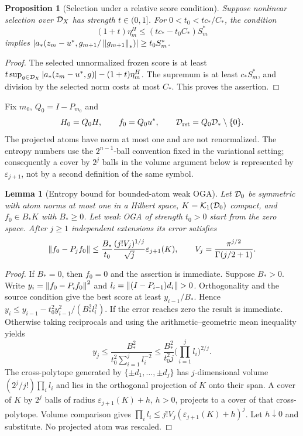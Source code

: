 \documentclass[11pt]{article}
\newtheorem{lemma}[theorem]{Lemma}
\newtheorem{proposition}[theorem]{Proposition}
\theoremstyle{remark}
\begin{document}
\begin{proposition}[Selection under a relative score condition]
\label{prop:c5-transfer}
Suppose nonlinear selection over $\mathcal D_X$ has strength $t\in(0,1]$.
For $0<t_0<tc_*/C_*$, the condition
\begin{equation}
 (1+t)\eta_m^H\leq(tc_*-t_0C_*)S_m^*
 \label{eq:c5-relative}
\end{equation}
implies
$|a_*(z_m-u^*,g_{m+1}/\left\lVert g_{m+1}\right\rVert_*)|\geq t_0S_m^*$.
\end{proposition}
\begin{proof}
The selected unnormalized frozen score is at least
$t\sup_{g\in\mathcal D_X}|a_*(z_m-u^*,g)|-(1+t)\eta_m^H$.
The supremum is at least $c_*S_m^*$, and division by the selected
norm costs at most $C_*$. This proves the assertion.
\end{proof}

Fix $m_0$, $Q_0=I-P_{m_0}$ and
\[
 H_0=Q_0H,\qquad f_0=Q_0u^*,\qquad
 \mathcal D_{\rm rst}=Q_0\mathcal D_*\setminus\{0\}.
\]
The projected atoms have norm at most one and are not renormalized.
The entropy numbers use the \(2^{n-1}\)-ball convention fixed in
the variational setting; consequently a cover by \(2^j\) balls in the
volume argument below is represented by \(\varepsilon_{j+1}\), not by a
second definition of the same symbol.

\begin{lemma}[Entropy bound for bounded-atom weak OGA]
\label{lem:c5-entropy}
Let $\mathcal D_0$ be symmetric with atom norms at most one in a Hilbert space,
$K=\mathcal K_1(\mathcal D_0)$ compact, and $f_0\in B_*K$ with $B_*\geq0$.
Let weak OGA of strength $t_0>0$ start from the zero space.
After $j\geq1$ independent extensions its error satisfies
\begin{equation}
 \left\lVert f_0-P_jf_0\right\rVert\leq
 \frac{B_*}{t_0}\frac{(j!V_j)^{1/j}}{\sqrt j}
                    \varepsilon_{j+1}(K),\qquad
 V_j=\frac{\pi^{j/2}}{\Gamma(j/2+1)} .
 \label{eq:c5-entropy}
\end{equation}
\end{lemma}
\begin{proof}
If $B_*=0$, then $f_0=0$ and the assertion is immediate. Suppose $B_*>0$.
Write $y_i=\left\lVert f_0-P_if_0\right\rVert^2$ and
$l_i=\left\lVert(I-P_{i-1})d_i\right\rVert>0$.
Orthogonality and the source condition give the best score at least
$y_{i-1}/B_*$. Hence
$y_i\leq y_{i-1}-t_0^2y_{i-1}^2/(B_*^2l_i^2)$.
If the error reaches zero the result is immediate. Otherwise taking
reciprocals and using the arithmetic--geometric mean inequality yields
\[
 y_j\leq \frac{B_*^2}{t_0^2\sum_{i=1}^jl_i^{-2}}
 \leq \frac{B_*^2}{t_0^2j}\Big(\prod_{i=1}^jl_i\Big)^{2/j}.
\]
The cross-polytope generated by $\{\pm d_1,\ldots,\pm d_j\}$ has
$j$-dimensional volume $(2^j/j!)\prod_i l_i$ and lies in the orthogonal
projection of $K$ onto their span. A cover of $K$ by $2^j$ balls of radius
\(\varepsilon_{j+1}(K)+h\), \(h>0\), projects to a cover of that
cross-polytope. Volume comparison gives
$\prod_i l_i\leq j!V_j(\varepsilon_{j+1}(K)+h)^j$.
Let $h\downarrow0$ and substitute. No projected atom was rescaled.
\end{proof}
\end{document}
